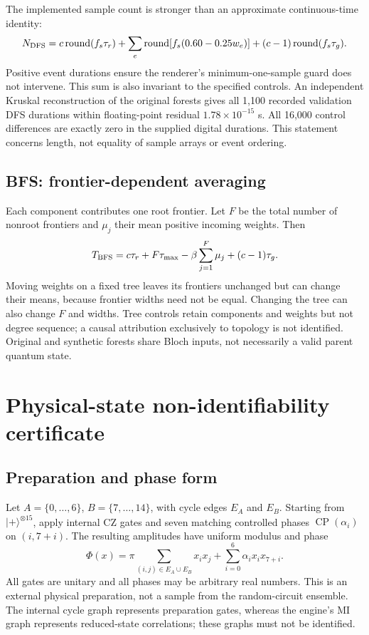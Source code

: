\documentclass[11pt,a4paper]{article}
\begin{document}
The implemented sample count is stronger than an approximate continuous-time identity:
\[
N_{\rm DFS}=c\operatorname{round}(f_s\tau_r)+\sum_e\operatorname{round}[f_s(0.60-0.25w_e)]+(c-1)\operatorname{round}(f_s\tau_g).
\]
Positive event durations ensure the renderer's minimum-one-sample guard does not intervene. This sum is also invariant to the specified controls. An independent Kruskal reconstruction of the original forests gives all 1,100 recorded validation DFS durations within floating-point residual $1.78\times10^{-15}$ s. All 16,000 control differences are exactly zero in the supplied digital durations. This statement concerns length, not equality of sample arrays or event ordering.

\subsection{BFS: frontier-dependent averaging}
Each component contributes one root frontier. Let $F$ be the total number of nonroot frontiers and $\mu_j$ their mean positive incoming weights. Then
\[
T_{\rm BFS}=c\tau_r+F\tau_{\max}-\beta\sum_{j=1}^F\mu_j+(c-1)\tau_g.
\]
Moving weights on a fixed tree leaves its frontiers unchanged but can change their means, because frontier widths need not be equal. Changing the tree can also change $F$ and widths. Tree controls retain components and weights but not degree sequence; a causal attribution exclusively to topology is not identified. Original and synthetic forests share Bloch inputs, not necessarily a valid parent quantum state.

\section{Physical-state non-identifiability certificate}
\subsection{Preparation and phase form}
Let $A=\{0,\ldots,6\}$, $B=\{7,\ldots,14\}$, with cycle edges $E_A$ and $E_B$. Starting from $|+\rangle^{\otimes15}$, apply internal CZ gates and seven matching controlled phases $\operatorname{CP}(\alpha_i)$ on $(i,7+i)$. The resulting amplitudes have uniform modulus and phase
\[
\Phi(x)=\pi\sum_{(i,j)\in E_A\cup E_B}x_ix_j+\sum_{i=0}^{6}\alpha_i x_i x_{7+i}.
\]
All gates are unitary and all phases may be arbitrary real numbers. This is an external physical preparation, not a sample from the random-circuit ensemble. The internal cycle graph represents preparation gates, whereas the engine's MI graph represents reduced-state correlations; these graphs must not be identified.
\end{document}
